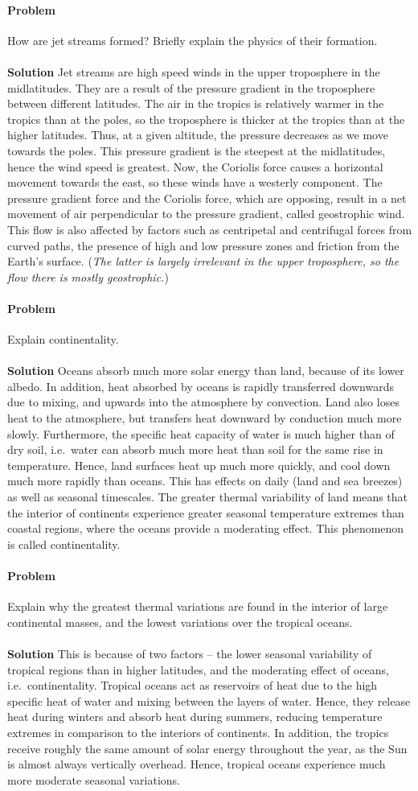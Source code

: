 \documentclass[10pt]{article}
\newcounter{prob}
\def\problem{\stepcounter{prob}\paragraph{Problem \arabic{prob}}}
\def\solution{\\\\\textbf{Solution }}
\begin{document}
        \problem How are jet streams formed? Briefly explain the physics of their formation.
        \solution Jet streams are high speed winds in the upper troposphere in the midlatitudes. They are a result of the pressure gradient
        in the troposphere between different latitudes. The air in the tropics is relatively warmer in the tropics than at the poles,
        so the troposphere is thicker at the tropics than at the higher latitudes. Thus, at a given altitude, the pressure decreases
        as we move towards the poles. This pressure gradient is the steepest at the midlatitudes, hence the wind speed is greatest.
        Now, the Coriolis force causes a horizontal movement towards the east, so these winds have a westerly component.
        The pressure gradient force and the Coriolis force, which are opposing, result in a net movement of air perpendicular
        to the pressure gradient, called geostrophic wind. This flow is also affected by factors such as centripetal and centrifugal
        forces from curved paths, the presence of high and low pressure zones and friction from the Earth's surface. ({\it The latter is 
        largely irrelevant in the upper troposphere, so the flow there is mostly geostrophic.})

        \problem Explain continentality.
        \solution Oceans absorb much more solar energy than land, because of its lower albedo. In addition, heat absorbed by oceans
        is rapidly transferred downwards due to mixing, and upwards into the atmosphere by convection. Land also loses heat to 
        the atmosphere, but transfers heat downward by conduction much more slowly. Furthermore, the specific heat capacity
        of water is much higher than of dry soil, i.e.\ water can absorb much more heat than soil for the same rise in temperature.
        Hence, land surfaces heat up much more quickly, and cool down much more rapidly than oceans. This has effects on daily
        (land and sea breezes) as well as seasonal timescales. The greater thermal variability of land means that the interior of
        continents experience greater seasonal temperature extremes than coastal regions, where the oceans provide a moderating effect.
        This phenomenon is called continentality.

        \problem Explain why the greatest thermal variations are found in the interior of large continental masses,
        and the lowest variations over the tropical oceans.
        \solution This is because of two factors -- the lower seasonal variability of tropical regions than in higher latitudes,
        and the moderating effect of oceans, i.e.\ continentality. Tropical oceans act as reservoirs of heat due to the high specific heat
        of water and mixing between the layers of water. Hence, they release heat during winters and absorb heat during summers,
        reducing temperature extremes in comparison to the interiors of continents. In addition, the tropics receive roughly the same
        amount of solar energy throughout the year, as the Sun is almost always vertically overhead. Hence, tropical oceans
        experience much more moderate seasonal variations.
\end{document}
